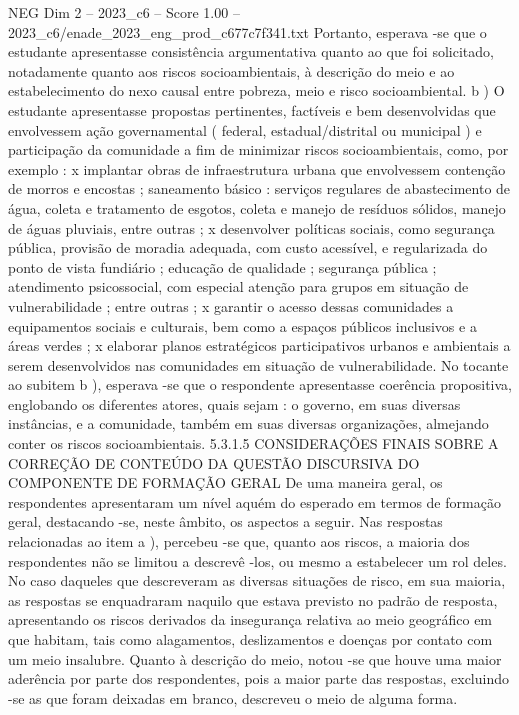 \begin{textsample}{NEG Dim 2 – 2023\_c6 – Score 1.00 – 2023\_c6/enade\_2023\_eng\_prod\_c677c7f341.txt}
Portanto, esperava -se que o estudante apresentasse consistência argumentativa quanto ao que foi solicitado, notadamente quanto aos riscos socioambientais, à descrição do meio e ao estabelecimento do nexo causal entre pobreza, meio e risco socioambiental. b ) O estudante apresentasse propostas pertinentes, factíveis e bem desenvolvidas que envolvessem ação governamental ( federal, estadual/distrital ou municipal ) e participação da comunidade a fim de minimizar riscos socioambientais, como, por exemplo : x implantar obras de infraestrutura urbana que envolvessem contenção de morros e encostas ; saneamento básico : serviços regulares de abastecimento de água, coleta e tratamento de esgotos, coleta e manejo de resíduos sólidos, manejo de águas pluviais, entre outras ; x desenvolver políticas sociais, como segurança pública, provisão de moradia adequada, com custo acessível, e regularizada do ponto de vista fundiário ; educação de qualidade ; segurança pública ; atendimento psicossocial, com especial atenção para grupos em situação de vulnerabilidade ; entre outras ; x garantir o acesso dessas comunidades a equipamentos sociais e culturais, bem como a espaços públicos inclusivos e a áreas verdes ; x elaborar planos estratégicos participativos urbanos e ambientais a serem desenvolvidos nas comunidades em situação de vulnerabilidade.
No tocante ao subitem b ), esperava -se que o respondente apresentasse coerência propositiva, englobando os diferentes atores, quais sejam : o governo, em suas diversas instâncias, e a comunidade, também em suas diversas organizações, almejando conter os riscos socioambientais. 5.3.1.5 CONSIDERAÇÕES FINAIS SOBRE A CORREÇÃO DE CONTEÚDO DA QUESTÃO DISCURSIVA DO COMPONENTE DE FORMAÇÃO GERAL De uma maneira geral, os respondentes apresentaram um nível aquém do esperado em termos de formação geral, destacando -se, neste âmbito, os aspectos a seguir.
Nas respostas relacionadas ao item a ), percebeu -se que, quanto aos riscos, a maioria dos respondentes não se limitou a descrevê -los, ou mesmo a estabelecer um rol deles.
No caso daqueles que descreveram as diversas situações de risco, em sua maioria, as respostas se enquadraram naquilo que estava previsto no padrão de resposta, apresentando os riscos derivados da insegurança relativa ao meio geográfico em que habitam, tais como alagamentos, deslizamentos e doenças por contato com um meio insalubre.
Quanto à descrição do meio, notou -se que houve uma maior aderência por parte dos respondentes, pois a maior parte das respostas, excluindo -se as que foram deixadas em branco, descreveu o meio de alguma forma.

\end{textsample}
